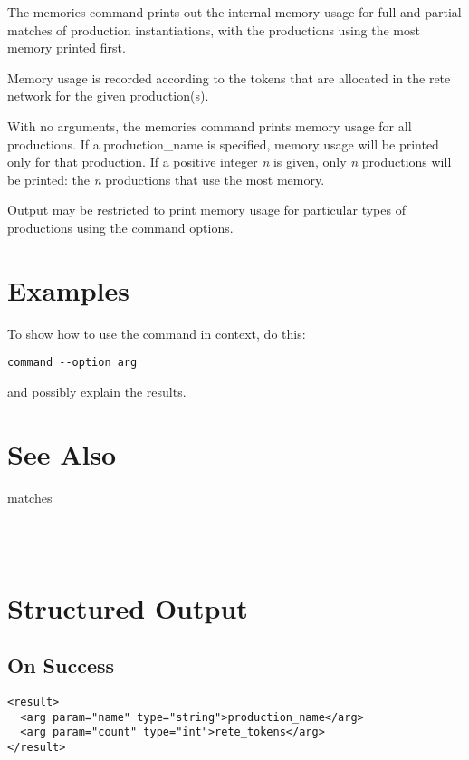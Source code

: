 \documentclass[10pt]{article}
\begin{document}
 The memories command prints out the internal memory usage for full and partial matches of production instantiations, with the productions using the most memory printed first. 


 Memory usage is recorded according to the tokens that are allocated in the rete network for the given production(s). 


 With no arguments, the memories command prints memory usage for all productions. If a production\_name is specified, memory usage will be printed only for that production. If a positive integer \emph{n}
 is given, only \emph{n}
 productions will be printed: the \emph{n}
 productions that use the most memory. 


 Output may be restricted to print memory usage for particular types of productions using the command options. 
\section*{ Examples }


 To show how to use the command in context, do this: \begin{verbatim}
command --option arg

\end{verbatim}



 and possibly explain the results. 
\section*{ See Also }
\begin{description}
matches

\end{description}


 \\ 



 \\ 

\section*{ Structured Output }
\subsection*{ On Success }
\begin{verbatim}
<result>
  <arg param="name" type="string">production_name</arg>
  <arg param="count" type="int">rete_tokens</arg>
</result>

\end{verbatim}
\end{document}
